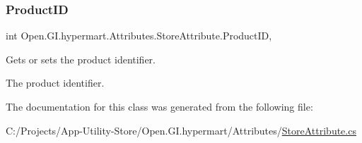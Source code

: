 \subsubsection{\texorpdfstring{Product\+ID}{ProductID}}
{\footnotesize\ttfamily int Open.\+G\+I.\+hypermart.\+Attributes.\+Store\+Attribute.\+Product\+ID\hspace{0.3cm}{\ttfamily [get]}, {\ttfamily [set]}}



Gets or sets the product identifier. 

The product identifier. 

The documentation for this class was generated from the following file\+:\begin{DoxyCompactItemize}
\item 
C\+:/\+Projects/\+App-\/\+Utility-\/\+Store/\+Open.\+G\+I.\+hypermart/\+Attributes/\hyperlink{_store_attribute_8cs}{Store\+Attribute.\+cs}\end{DoxyCompactItemize}
